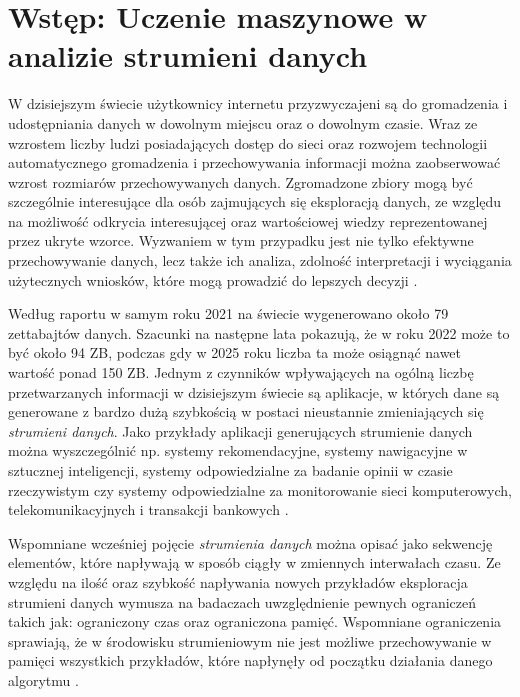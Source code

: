 \chapter{Wstęp: Uczenie maszynowe w analizie strumieni danych}

\noindent W dzisiejszym świecie użytkownicy internetu przyzwyczajeni są do gromadzenia i udostępniania danych w dowolnym miejscu oraz o dowolnym czasie. Wraz ze wzrostem liczby ludzi posiadających dostęp do sieci oraz rozwojem technologii automatycznego gromadzenia i przechowywania informacji można zaobserwować wzrost rozmiarów przechowywanych danych. Zgromadzone zbiory mogą być szczególnie interesujące dla osób zajmujących się eksploracją danych, ze względu na możliwość odkrycia interesującej oraz wartościowej wiedzy reprezentowanej przez ukryte wzorce. Wyzwaniem w tym przypadku jest nie tylko efektywne przechowywanie danych, lecz także ich analiza, zdolność interpretacji i wyciągania użytecznych wniosków, które mogą prowadzić do lepszych decyzji \cite{DBrzezinski}\cite{Prezentacja:ZED}.

Według raportu \cite{Article:BigData} w samym roku 2021 na świecie wygenerowano około 79 zettabajtów danych. Szacunki na następne lata pokazują, że w roku 2022 może to być około 94 ZB, podczas gdy w 2025 roku liczba ta może osiągnąć nawet wartość ponad 150 ZB. Jednym z czynników wpływających na ogólną liczbę przetwarzanych informacji w dzisiejszym świecie są aplikacje, w których dane są generowane z bardzo dużą szybkością w postaci nieustannie zmieniających się \textit{strumieni danych}. Jako przykłady aplikacji generujących strumienie danych można wyszczególnić np. systemy rekomendacyjne, systemy nawigacyjne w sztucznej inteligencji, systemy odpowiedzialne za badanie opinii w czasie rzeczywistym czy systemy odpowiedzialne za monitorowanie sieci komputerowych, telekomunikacyjnych i transakcji bankowych \cite{DBrzezinski:Prezentacja}.

Wspomniane wcześniej pojęcie \textit{strumienia danych} można opisać jako sekwencję elementów, które napływają w sposób ciągły w zmiennych interwałach czasu. Ze względu na ilość oraz szybkość napływania nowych przykładów eksploracja strumieni danych wymusza na badaczach uwzględnienie pewnych ograniczeń takich jak: ograniczony czas oraz ograniczona pamięć. Wspomniane ograniczenia sprawiają, że w środowisku strumieniowym nie jest możliwe przechowywanie w pamięci wszystkich przykładów, które napłynęły od początku działania danego algorytmu \cite{DBrzezinski}\cite{BrzezPhd2015}.

